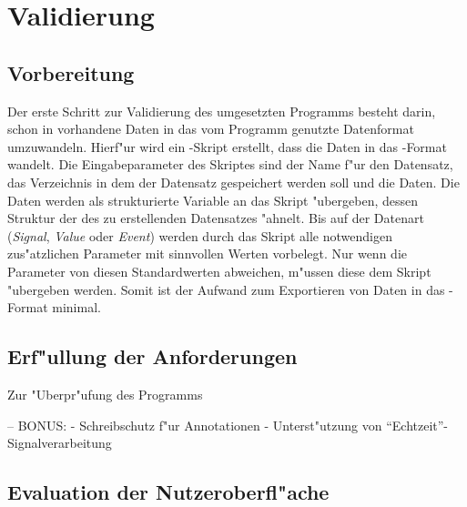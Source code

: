 \chapter{Validierung}
\label{chap:validierung}

\section{Vorbereitung}

Der erste Schritt zur Validierung des umgesetzten Programms besteht darin, schon in \ml vorhandene Daten in das vom Programm genutzte Datenformat umzuwandeln.
Hierf"ur wird ein \mlNS-Skript erstellt, dass die Daten in das \usNS-Format wandelt.
Die Eingabeparameter des Skriptes sind der Name f"ur den Datensatz, das Verzeichnis in dem der Datensatz gespeichert werden soll und die Daten.
Die Daten werden als strukturierte Variable an das Skript "ubergeben, dessen Struktur der des zu erstellenden Datensatzes "ahnelt.
Bis auf der Datenart (\emph{Signal}, \emph{Value} oder \emph{Event}) werden durch das Skript alle notwendigen zus"atzlichen Parameter mit sinnvollen Werten vorbelegt.
Nur wenn die Parameter von diesen Standardwerten abweichen, m"ussen diese dem Skript "ubergeben werden.
Somit ist der Aufwand zum Exportieren von Daten in das \usNS-Format minimal.


\section{Erf"ullung der Anforderungen}
\label{sec:anforderungsvalidierung}

Zur "Uberpr"ufung des Programms

-- BONUS:
- Schreibschutz f"ur Annotationen
- Unterst"utzung von "`Echtzeit"'-Signalverarbeitung

\section{Evaluation der Nutzeroberfl"ache}






